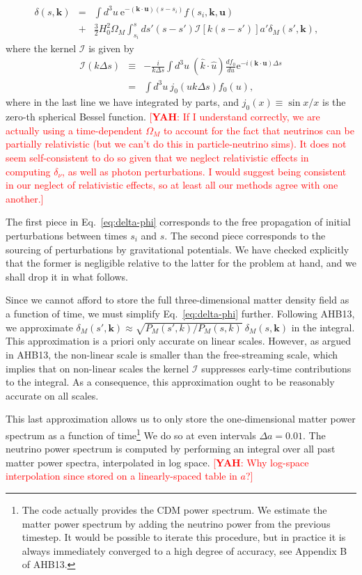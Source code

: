 \documentclass[useAMS, usenatbib]{mnras}
\newcommand{\barr}{\begin{eqnarray}}
\newcommand{\earr}{\end{eqnarray}}
\newcommand{\rme}{\textrm{e}}
\newcommand{\bs}{\mathbf}
\newcommand{\yah}[1]{{\textcolor{red}{[{\bf YAH}: #1]}}}
\begin{document}
\barr
\delta(s, \bs{k}) &=& \int d^3 u ~ \rme^{- (\bs{k} \cdot \bs{u}) (s - s_i)} f(s_i, \bs{k}, \bs{u}) \nonumber\\
&+& \frac32 H_0^2 \Omega_M \int_{s_i}^s d s' (s-s') \mathcal{I}[k(s-s')] a' \delta_M(s', \bs{k}), ~~~~\label{eq:delta-phi}
\earr
where the kernel $\mathcal{I}$ is given by \citep{Brandenberger_1987, Bertschinger_Watts_1988}
\barr
\mathcal{I}(k \Delta s) &\equiv& - \frac{i}{k \Delta s} \int d^3 u  ~(\hat{k} \cdot  \hat{u}) \frac{d f_0}{du}\rme^{- i(\bs{k} \cdot \bs{u}) \Delta s} \nonumber\\
&=& \int d^3 u ~	 j_0(u k \Delta s) f_0(u), 
\earr
where in the last line we have integrated by parts, and $j_0(x) \equiv \sin x/x$ is the zero-th spherical Bessel function. \yah{If I understand correctly, we are actually using a time-dependent $\Omega_M$ to account for the fact that neutrinos can be partially relativistic (but we can't do this in particle-neutrino sims). It does not seem self-consistent to do so given that we neglect relativistic effects in computing $\delta_\nu$, as well as photon perturbations. I would suggest being consistent in our neglect of relativistic effects, so at least all our methods agree with one another.}


The first piece in Eq.~\eqref{eq:delta-phi} corresponds to the free propagation of initial perturbations between times $s_i$ and $s$. The second piece corresponds to the sourcing of perturbations by gravitational potentials. We have checked explicitly that the former is negligible relative to the latter for the problem at hand, and we shall drop it in what follows. 



Since we cannot afford to store the full three-dimensional matter density field as a function of time, we must simplify Eq.~\eqref{eq:delta-phi} further. Following AHB13, we approximate $\delta_M(s', \bs{k}) \approx \sqrt{P_M(s', k)/P_M(s, k)}~ \delta_M(s, \bs{k})$ in the integral. This approximation is a priori only accurate on linear scales. However, as argued in AHB13, the non-linear scale is smaller than the free-streaming scale, which implies that on non-linear scales the kernel $\mathcal{I}$ suppresses early-time contributions to the integral. As a consequence, this approximation ought to be reasonably accurate on all scales. 

This last approximation allows us to only store the one-dimensional matter power spectrum as a function of time\footnote{The code actually provides the CDM power spectrum. We estimate the matter power spectrum by adding the neutrino power from the previous timestep. It would be possible to iterate this procedure, but in practice it is always immediately converged to a high degree of accuracy, see Appendix B of AHB13.} We do so at even intervals $\Delta a = 0.01$. The neutrino power spectrum is computed by performing an integral over all past matter power spectra, interpolated in log space. \yah{Why log-space interpolation since stored on a linearly-spaced table in $a$?}
\end{document}
